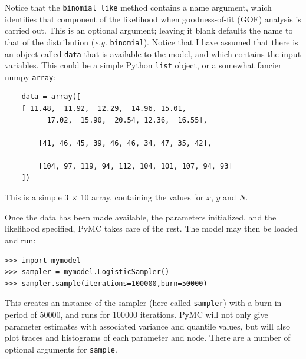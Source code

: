 \documentclass[]{book}
\begin{document}
Notice that the \verb=binomial_like= method contains a name argument, which identifies that component of the likelihood when goodness-of-fit (GOF) analysis is carried out. This is an optional argument; leaving it blank defaults the name to that of the distribution (\emph{e.g.} \verb=binomial=). Notice that I have assumed that there is an object called \verb=data= that is available to the model, and which contains the input variables. This could be a simple Python \verb=list= object, or a somewhat fancier numpy \verb=array=:

\begin{verbatim}
    data = array([
    [ 11.48,  11.92,  12.29,  14.96, 15.01,
          17.02,  15.90,  20.54, 12.36,  16.55],

        [41, 46, 45, 39, 46, 46, 34, 47, 35, 42],

        [104, 97, 119, 94, 112, 104, 101, 107, 94, 93]
    ])
\end{verbatim}
This is a simple 3 $\times$ 10 array, containing the values for $x$, $y$ and $N$.

Once the data has been made available, the parameters initialized, and the likelihood specified, PyMC takes care of the rest. The model may then be loaded and run:
\begin{verbatim}
>>> import mymodel
>>> sampler = mymodel.LogisticSampler()
>>> sampler.sample(iterations=100000,burn=50000)
\end{verbatim}
This creates an instance of the sampler (here called \verb=sampler=) with a burn-in period of 50000, and runs for 100000 iterations. PyMC will not only give parameter estimates with associated variance and quantile values, but will also plot traces and histograms of each parameter and node. There are a number of optional arguments for \verb=sample=.
\end{document}
